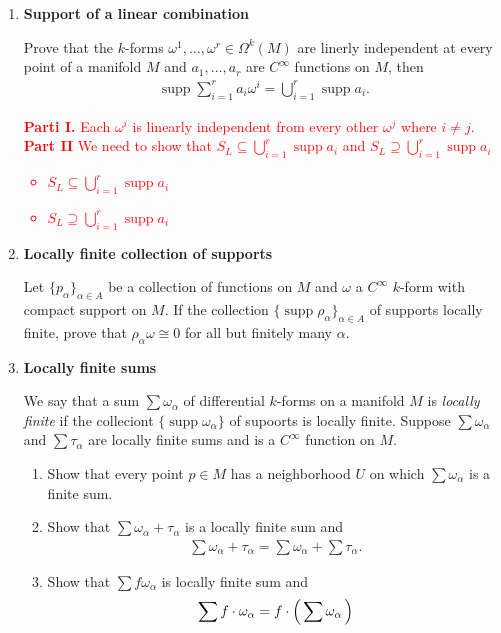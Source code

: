 \documentclass[12pt,a4paper]{report}
\newcommand{\RED}[1]{\textcolor{red}{#1}}
\newcommand{\SUPP}{\operatorname{supp}}
\begin{document}
\begin{enumerate}[label=18.\arabic*]
	\item \textbf{Support of a linear combination}
	
	Prove that the $k$-forms $\omega^1,\dots, \omega^r \in \Omega^k(M)$ are linerly independent at every point of a manifold $M$ and $a_1,\dots, a_r$ are $C^\infty$ functions on $M$, then
	\begin{align*}
		\SUPP \sum_{i=1}^r a_i\omega^i = \bigcup_{i=1}^r \SUPP a_i.
	\end{align*}
	
	\RED{\textbf{Parti I.}  Each $\omega^i$ is linearly independent from every other $\omega^j$ where $i\ne j$. \\
	\textbf{Part II}  We need to show that $S_L \subseteq \bigcup_{i=1}^r \SUPP a_i$ and $S_L \supseteq \bigcup_{i=1}^r \SUPP a_i$
	\begin{itemize}
		\item \textbf{$S_L \subseteq \bigcup_{i=1}^r \SUPP a_i$}
		\item \textbf{$S_L \supseteq \bigcup_{i=1}^r \SUPP a_i$}
	\end{itemize}
	}
	
	\item \textbf{Locally finite collection of supports}
	
	Let $\{p_\alpha\}_{\alpha\in A}$ be a collection of functions on $M$ and $\omega$ a $C^\infty$ $k$-form with compact support on $M$.  If the collection $\{\SUPP \rho_\alpha\}_{\alpha\in A}$ of supports locally finite,  prove that $\rho_\alpha\omega \cong 0$ for all but finitely many $\alpha$.
	
	\item \textbf{Locally finite sums}
	
	We say that a sum $\sum \omega_\alpha$ of differential $k$-forms on a manifold $M$ is \textit{locally finite} if the colleciont $\{\SUPP \omega_\alpha\}$ of supoorts is locally finite.  Suppose $\sum \omega_\alpha$ and $\sum \tau_\alpha$ are locally finite sums and is a $C^\infty$ function on $M$.
	\begin{enumerate}[label=(\alph*)]
	
		\item Show that every point $p \in M$ has a neighborhood $U$ on which $\sum \omega_\alpha$ is a finite sum.
		\item Show that $\sum \omega_\alpha + \tau_\alpha$ is a locally finite sum and 
		\begin{align*}
			\sum \omega_\alpha + \tau_\alpha = \sum \omega_\alpha + \sum\tau_\alpha.
		\end{align*}
		\item Show that $\sum f\omega_\alpha$ is locally finite sum and 
		\begin{align*}
			\sum f\cdot \omega_\alpha = f\cdot\left (\, \sum \omega_\alpha \,\right )
		\end{align*}
		

\end{enumerate}
\end{enumerate}
\end{document}
